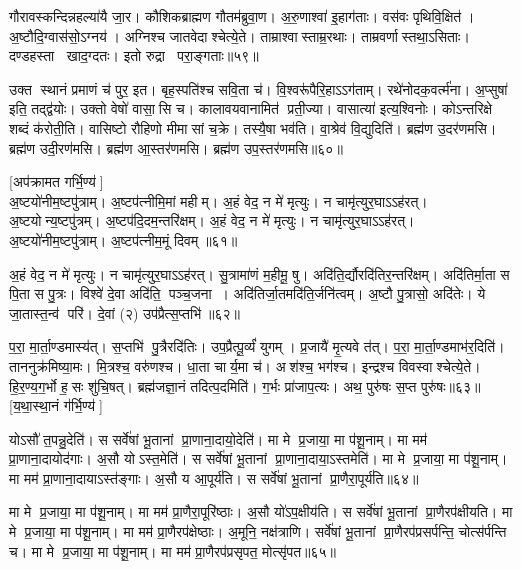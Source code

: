 गौरावस्कन्दिन्नहल्या॑यै जा॒र। कौशिकब्राह्मण गौतम॑ब्रुवा॒ण। 
अ॒रु॒णाश्वा॑ इ॒हाग॑ताः। वस॑वः पृथिवि॒क्षित॑। 
अ॒ष्टौदि॒ग्वास॑सो॒\-ऽग्नय॑। अग्निश्च जातवेदाश्चेत्ये॒ते। 
ताम्राश्वास्ताम्र॒रथाः। ताम्रवर्णास्तथा॒\-ऽसिताः। 
दण्डहस्ता खाद॒ग्दतः। इतो रुद्रा परा॒ङ्गताः॥५९॥


उक्त स्थानं प्रमाणं च॑ पुर॒ इत। बृह॒स्पति॑श्च सवि॒ता च॑। 
वि॒श्वरू॑पैरि॒हाऽऽग॑ताम्‌। रथे॑नोदक॒वर्त्म॑ना। 
अ॒प्सुषा॑ इति॒ तद्द्व॑योः। उक्तो वेषो॑ वासा॒सि च। 
कालावयवानामित॑ प्रती॒ज्या। वासात्या॑ इत्य॒श्विनोः। 
कोऽन्तरिक्षे शब्दं क॑रोती॒ति। वासिष्टो रौहिणो मीमासां च॒क्रे। 
तस्यै॒षा भव॑ति। वा॒श्रेव॑ वि॒द्युदिति॑। 
ब्रह्म॑ण उ॒दर॑णमसि। ब्रह्म॑ण उदी॒रण॑मसि। 
ब्रह्म॑ण आ॒स्तर॑णमसि। ब्रह्म॑ण उप॒स्तर॑णमसि॥६०॥\anuvakamend


[अप॑क्रामत गर्भि॒ण्य॑]\\
अ॒ष्टयो॑नीम॒ष्टपु॑त्राम्‌। अ॒ष्टप॑त्नीमि॒मां महीम्‌। 
अ॒हं वेद॒ न मे॑ मृत्युः। न चामृ॑त्युर॒घाऽऽह॑रत्‌। 
अ॒ष्टयोन्य॒ष्टपु॑त्रम्‌। अ॒ष्टप॑दि॒दम॒न्तरि॑क्षम्‌। 
अ॒हं वेद॒ न मे॑ मृत्युः। न चामृ॑त्युर॒घाऽऽह॑रत्‌। 
अ॒ष्टयो॑नीम॒ष्टपु॑त्राम्‌। अ॒ष्टप॑त्नीम॒मूं दिवम्‌॥६१॥


अ॒हं वेद॒ न मे॑ मृत्युः। न चामृ॑त्युर॒घाऽऽह॑रत्‌। 
सु॒त्रामा॑णं म॒हीमू॒ षु। अदि॑ति॒र्द्यौरदि॑तिर॒न्तरि॑क्षम्। 
अदि॑तिर्मा॒ता स पि॒ता स पु॒त्रः। विश्वे॑ दे॒वा अदि॑ति॒ पञ्च॒जना। 
अदि॑तिर्जा॒तमदि॑ति॒र्जनि॑त्वम्‌। अ॒ष्टौ पु॒त्रासो॒ अदि॑तेः। 
ये जा॒तास्त॒न्व॑ परि॑। दे॒वां (२) उप॑प्रैत्स॒प्तभि॑॥६२॥


प॒रा॒ मा॒र्ता॒ण्डमास्य॑त्‌। स॒प्तभि॑ पु॒त्रैरदि॑तिः। 
उप॒प्रैत्पू॒र्व्यं॑ युगम्। प्र॒जायै॑ मृ॒त्यवे त॑त्‌। 
प॒रा॒ मा॒र्ता॒ण्डमाभ॑र॒दिति॑। ताननुक्र॑मिष्या॒मः। 
मि॒त्रश्च॒ वरु॑णश्च। धा॒ता चार्य॒मा च॑। 
अश॑श्च॒ भग॑श्च। इन्द्रश्च विवस्वाश्चेत्ये॒ते। 
हि॒र॒ण्य॒ग॒र्भो ह॒सः शु॑चि॒षत्‌। 
ब्रह्म॑जज्ञा॒नं तदित्प॒दमिति॑। ग॒र्भः प्रा॑जाप॒त्यः। 
अथ॒ पुरु॑षः स॒प्त पुरु॑षः॥६३॥\\\mbox{}
[य॒था॒स्था॒नं ग॑र्भि॒ण्य॑]\anuvakamend

योऽसौ॑ त॒पन्नु॒देति॑। स सर्वे॑षां भू॒तानां प्रा॒णाना॒दायो॒देति॑। 
मा मे प्र॒जाया॒ मा प॑शू॒नाम्‌। मा मम॑ प्रा॒णाना॒दायोद॑गाः। 
अ॒सौ योऽस्त॒मेति॑। स सर्वे॑षां भू॒तानां प्रा॒णाना॒दाया॒ऽस्तमेति॑। 
मा मे प्र॒जाया॒ मा प॑शू॒नाम्‌। मा मम॑ प्रा॒णाना॒दायाऽस्त॑ङ्गाः। 
अ॒सौ य आ॒पूर्य॑ति। स सर्वे॑षां भू॒तानां प्रा॒णैरा॒पूर्य॑ति॥६४॥


मा मे प्र॒जाया॒ मा प॑शू॒नाम्‌। मा मम॑ प्रा॒णैरा॒पूरि॑ष्ठाः। 
अ॒सौ यो॑ऽप॒क्षीय॑ति। स सर्वे॑षां भू॒तानां प्रा॒णैरप॑क्षीयति। 
मा मे प्र॒जाया॒ मा प॑शू॒नाम्‌। मा मम॑ प्रा॒णैरप॑क्षेष्ठाः। 
अ॒मूनि॒ नक्ष॑त्राणि। सर्वे॑षां भू॒तानां प्रा॒णैरप॑प्रसर्पन्ति॒ चोत्स॑र्पन्ति च। 
मा मे प्र॒जाया॒ मा प॑शू॒नाम्‌। मा मम॑ प्रा॒णैरप॑प्रसृपत॒ मोत्सृ॑पत॥६५॥


